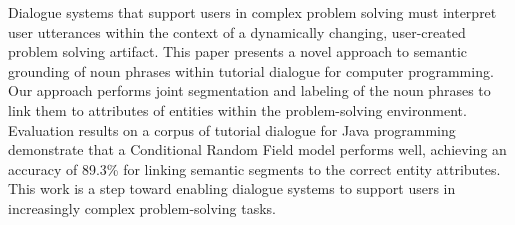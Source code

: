 Dialogue systems that support users in complex problem solving must interpret user utterances within the context of a dynamically changing, user-created problem solving artifact. This paper presents a novel approach to semantic grounding of noun phrases within tutorial dialogue for computer programming. Our approach performs joint segmentation and labeling of the noun phrases to link them to attributes of entities within the problem-solving environment. Evaluation results on a corpus of tutorial dialogue for Java programming demonstrate that a Conditional Random Field model performs well, achieving an accuracy of 89.3\% for linking semantic segments to the correct entity attributes. This work is a step toward enabling dialogue systems to support users in increasingly complex problem-solving tasks.
